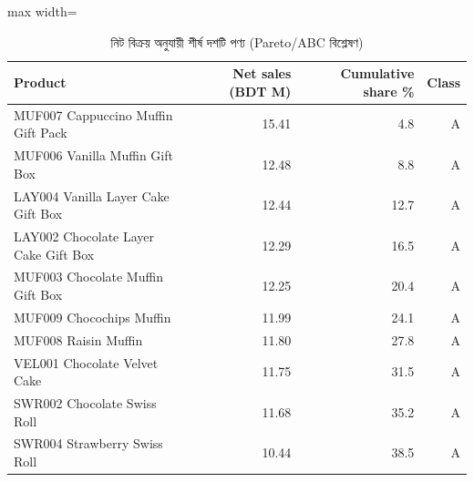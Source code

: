 \begin{table}[htbp]
\centering
\small
\caption{নিট বিক্রয় অনুযায়ী শীর্ষ দশটি পণ্য (Pareto/ABC বিশ্লেষণ)}
\label{tab:topproducts}
\begin{adjustbox}{max width=\linewidth}
\begin{tabular}{lrrr}
\toprule
\textbf{Product} & \textbf{Net sales (BDT M)} & \textbf{Cumulative share \%} & \textbf{Class} \\
\midrule
MUF007 Cappuccino Muffin Gift Pack & 15.41 & 4.8 & A \\
MUF006 Vanilla Muffin Gift Box & 12.48 & 8.8 & A \\
LAY004 Vanilla Layer Cake Gift Box & 12.44 & 12.7 & A \\
LAY002 Chocolate Layer Cake Gift Box & 12.29 & 16.5 & A \\
MUF003 Chocolate Muffin Gift Box & 12.25 & 20.4 & A \\
MUF009 Chocochips Muffin & 11.99 & 24.1 & A \\
MUF008 Raisin Muffin & 11.80 & 27.8 & A \\
VEL001 Chocolate Velvet Cake & 11.75 & 31.5 & A \\
SWR002 Chocolate Swiss Roll & 11.68 & 35.2 & A \\
SWR004 Strawberry Swiss Roll & 10.44 & 38.5 & A \\
\bottomrule
\end{tabular}
\end{adjustbox}
\end{table}